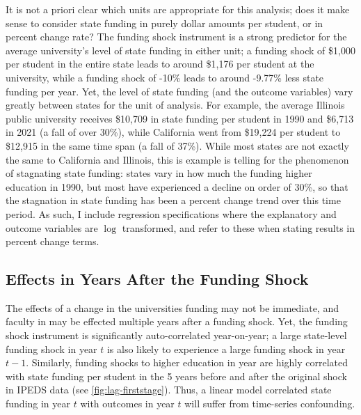 It is not a priori clear which units are appropriate for this analysis;
does it make sense to consider state funding in purely dollar amounts per student, or in percent change rate?
The funding shock instrument is a strong predictor for the average university's level of state funding in either unit; a funding shock of \$1,000 per student in the entire state leads to around \$1,176 per student at the university, while a funding shock of -10\% leads to around -9.77\% less state funding per year.
Yet, the level of state funding (and the outcome variables) vary greatly between states for the unit of analysis.
For example, the average Illinois public university receives \$10,709 in state funding per student in 1990 and  \$6,713 in 2021 (a fall of over 30\%), while California went from \$19,224 per student to \$12,915 in the same time span (a fall of 37\%).
While most states are not exactly the same to California and Illinois, this is example is telling for the phenomenon of stagnating state funding:
states vary in how much the funding higher education in 1990, but most have experienced a decline on order of 30\%, so that the stagnation in state funding has been a percent change trend over this time period.
As such, I include regression specifications where the explanatory and outcome variables are $\log$ transformed, and refer to these when stating results in percent change terms.

\subsection{Effects in Years After the Funding Shock}
\label{sec:empirical-substituion}

The effects of a change in the universities funding may not be immediate, and faculty in may be effected multiple years after a funding shock.
Yet, the funding shock instrument is significantly auto-correlated year-on-year; a large state-level funding shock in year $t$ is also likely to experience a large funding shock in year $t-1$.
Similarly, funding shocks to higher education in year are highly correlated with state funding per student in the 5 years before and after the original shock in IPEDS data (see \autoref{fig:lag-firststage}).
Thus, a linear model correlated state funding in year $t$ with outcomes in year $t$ will suffer from time-series confounding.


